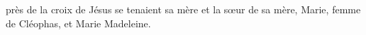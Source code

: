 \encetemps près de la croix de Jésus se tenaient sa mère
	et la sœur de sa mère, Marie, femme de Cléophas, et Marie Madeleine.
